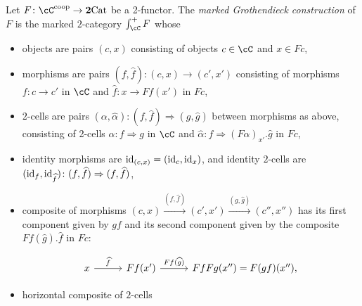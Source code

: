 \documentclass[11pt, dvipsnames]{amsart}
\begin{document}
        \begin{constr}\label{Const:marked-scaled-GC}
            Let $F\colon\cC^{\coop}\to \ttwocat$ be a 2-functor. The \emph{marked Grothendieck construction} of $F$ is the  marked $2$-category $\int_{\cC}^{+}F$ whose 
            \begin{itemize}[leftmargin=*]
                    \item \label{Const:marked-scaled-GC.1}
                    objects are pairs $(c,x)$ consisting of objects $c \in \cC$ and $x\in Fc$,

                    \item \label{Const:marked-scaled-GC.2} 
                    morphisms are pairs $(f,\widehat{f})\colon (c,x)\to (c',x')$ consisting of morphisms $f\colon c\to c'$ in $\cC$ and  $\widehat{f}\colon x \to Ff(x')$ in $Fc$,

                    \item \label{Const:marked-scaled-GC.3}
                    $2$-cells are pairs $(\alpha,\widehat{\alpha})\colon  (f,\widehat{f})\Rightarrow (g, \widehat{g})$ between morphisms as above, consisting of 2-cells $\alpha\colon f \Rightarrow g$ in $\cC$ and $\widehat{\alpha}\colon  \widehat{f} \Rightarrow (F\alpha)_{x'}.\widehat{g}$  in $Fc$,
                    
            \item \label{Const:marked-scaled-GC.4}
            identity morphisms are $\mathrm{id}_{(c,x)}= (\mathrm{id}_c, \mathrm{id}_{x})$, and
        identity $2$-cells are $(\mathrm{id}_f,\mathrm{id}_{\widehat{f}})\colon (f,\widehat{f}) \Rightarrow (f,\widehat{f})$,

            \item \label{Const:marked-scaled-GC.6}
            composite of morphisms 
            $(c,x)\xrightarrow{(f,\widehat f)} (c',x')\xrightarrow{(g,\widehat{g})} (c'',x'')$ has its first component given by $gf$ and its second component given by the composite $Ff(\widehat{g}).\widehat{f}$ in $Fc$:
    
            \[
                \begin{tikzcd}[column sep=1cm]
            x & {Ff(x')} & {FfFg(x'')=F(gf)(x''),}
            \arrow["{\widehat{f}}", from=1-1, to=1-2]
            \arrow["{Ff(\widehat{g})}", from=1-2, to=1-3]
                \end{tikzcd}
            \]
            \item \label{Const:marked-scaled-GC.7}
             horizontal composite of $2$-cells 
            

\end{itemize}
\end{constr}
\end{document}
